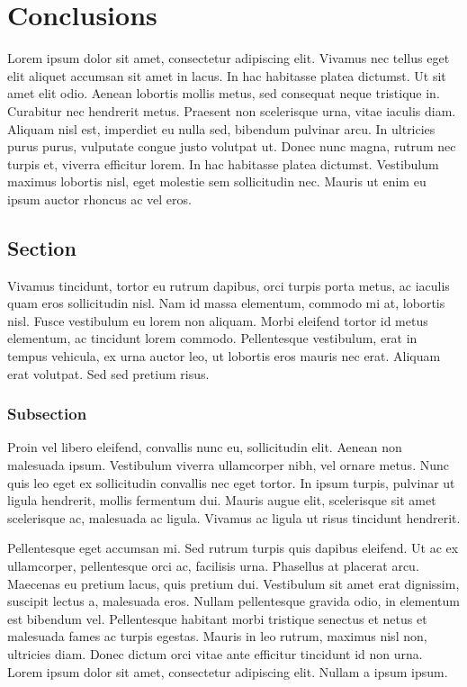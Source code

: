 \chapter{Conclusions}
\label{chapter5}

Lorem ipsum dolor sit amet, consectetur adipiscing elit. Vivamus nec tellus eget elit aliquet accumsan sit amet in lacus. In hac habitasse platea dictumst. Ut sit amet elit odio. Aenean lobortis mollis metus, sed consequat neque tristique in. Curabitur nec hendrerit metus. Praesent non scelerisque urna, vitae iaculis diam. Aliquam nisl est, imperdiet eu nulla sed, bibendum pulvinar arcu. In ultricies purus purus, vulputate congue justo volutpat ut. Donec nunc magna, rutrum nec turpis et, viverra efficitur lorem. In hac habitasse platea dictumst. Vestibulum maximus lobortis nisl, eget molestie sem sollicitudin nec. Mauris ut enim eu ipsum auctor rhoncus ac vel eros.

\section{Section}
Vivamus tincidunt, tortor eu rutrum dapibus, orci turpis porta metus, ac iaculis quam eros sollicitudin nisl. Nam id massa elementum, commodo mi at, lobortis nisl. Fusce vestibulum eu lorem non aliquam. Morbi eleifend tortor id metus elementum, ac tincidunt lorem commodo. Pellentesque vestibulum, erat in tempus vehicula, ex urna auctor leo, ut lobortis eros mauris nec erat. Aliquam erat volutpat. Sed sed pretium risus.

\subsection{Subsection}
Proin vel libero eleifend, convallis nunc eu, sollicitudin elit. Aenean non malesuada ipsum. Vestibulum viverra ullamcorper nibh, vel ornare metus. Nunc quis leo eget ex sollicitudin convallis nec \cite{Maeda1999} eget tortor. In ipsum turpis, pulvinar ut ligula hendrerit, mollis fermentum dui. Mauris augue elit, scelerisque sit amet scelerisque ac, malesuada ac ligula. Vivamus ac ligula ut risus tincidunt hendrerit.

Pellentesque eget accumsan mi. Sed rutrum turpis quis dapibus eleifend. Ut ac ex ullamcorper, pellentesque orci ac, facilisis urna. Phasellus at placerat arcu. Maecenas eu pretium lacus, quis pretium dui. Vestibulum sit amet erat dignissim, suscipit lectus a, malesuada eros. Nullam pellentesque gravida odio, in elementum est bibendum vel. Pellentesque habitant morbi tristique senectus et netus et malesuada fames ac turpis egestas. Mauris in leo rutrum, maximus nisl non, ultricies diam. Donec dictum orci vitae ante efficitur tincidunt id non urna. Lorem ipsum dolor sit amet, consectetur adipiscing elit. Nullam a ipsum ipsum.